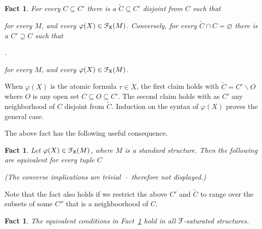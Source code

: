 \documentclass{amsproc}
\makeatletter
\newcounter{thm}
\theoremstyle{mio}
\newtheorem{fact}[thm]{Fact}\tcolorboxenvironment{fact}{mythm}
\providecommand{\proofNameStyle}{\bfseries}
\renewenvironment{proof}[1][\proofname]{\par
  \pushQED{\qed}%
  \normalfont%
  \trivlist
  \item[\hskip\labelsep
        \proofNameStyle
    #1\@addpunct{.}]\ignorespaces
}{%
  \popQED\endtrivlist\@endpefalse
}
\makeatother
\begin{document}
\begin{fact}
  For every $C\subseteq C'$ there is a $\tilde C\subseteq C'$ disjoint from $C$ such that\smallskip
  
  \smallskip

  for every $M$, and every $\varphi(X)\in{\EuScript F}_{\sf X}(M)$.
  Conversely, for every $\tilde C\cap C=\varnothing$ there is a $C'\supseteq C$ such that

  .\smallskip

  for every $M$, and every $\varphi(X)\in{\EuScript F}_{\sf X}(M)$.
\end{fact}

\begin{proof}
  When $\varphi(X)$ is the atomic formula $\tau\in X$, the first claim holds with $\tilde C=C'\smallsetminus O$ where $O$ is any open set $C\subseteq O\subseteq C'$.
  The second claim holds with as $C'$ any neighborhood of $C$ disjoint from $\tilde C$.
  Induction on the syntax of $\varphi(X)$ proves the general case.
\end{proof}

The above fact has the following useful consequence.

\begin{fact}\label{fact_otto}
  Let $\varphi(X)\in{\EuScript F}_{\sf X}(M)$, where $M$ is a standard structure.
  Then the following are equivalent for every tuple $C$\smallskip
  
    \smallskip

    \smallskip

  (The converse implications are trivial~--~therefore not displayed.)
\end{fact}


Note that the fact also holds if we restrict the above $C'$ and $\tilde C$ to range over the subsets of some $C''$ that is a neighboorhood of $C$.

\begin{fact}\label{fact_saturation}
  The equivalent conditions in Fact~\ref{fact_otto} hold in all ${\EuScript F}$-saturated structures.
\end{fact}
\end{document}
